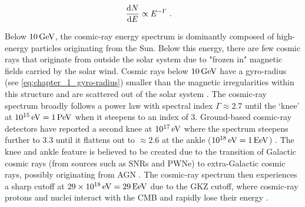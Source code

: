 \begin{equation}
    \begin{aligned}
    \dv{N}{E}&\propto E^{-\Gamma}\text{ .}
    \end{aligned}
\end{equation}

Below $10\,\GeV$, the cosmic-ray energy spectrum is dominantly composed of high-energy particles originating from the Sun. Below this energy, there are few cosmic rays that originate from outside the solar system due to "frozen in" magnetic fields carried by the solar wind. Cosmic rays below $10\,\GeV$ have a gyro-radius (see \autoref{eq:chapter_1_gyro-radius}) smaller than the magnetic irregularities within this structure and are scattered out of the solar system \citep{2002cra..book.....S}. The cosmic-ray spectrum broadly follows a power law with spectral index $\Gamma\approx 2.7$ until the `knee' at $10^{15}\,\eV=1\,\PeV$ when it steepens to an index of $3$. Ground-based cosmic-ray detectors have reported a second knee at $10^{17}\,\eV$ where the spectrum steepens further to $3.3$ until it flattens out to $\approx 2.6$ at the ankle ($10^{18}\,\eV=1\,\si{E\electronvolt}$) \citep{2008ApJ...678.1165A,2010PhLB..685..239A, 2013PhRvD..87h1101A, 2013PhRvD..88d2004A,2013ApJ...768L...1A}. The knee and ankle feature is believed to be created due to the transition of Galactic cosmic rays (from sources such as SNRs and PWNe) to extra-Galactic cosmic rays, possibly originating from AGN \citep{2016A&A...595A..33T}. The cosmic-ray spectrum then experiences a sharp cutoff at $29\times10^{18}\,\eV = 29\,\si{E\electronvolt}$ due to the GKZ cutoff, where cosmic-ray protons and nuclei interact with the CMB and rapidly lose their energy \citep{1966PhRvL..16..748G,1966JETPL...4...78Z}. 

